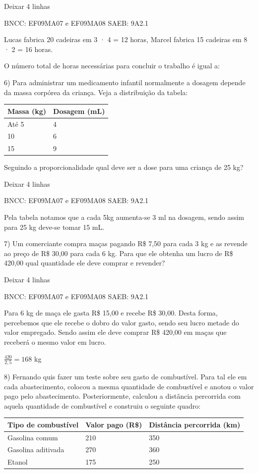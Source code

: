 \begin{escolha}
{{{\begin{escolha}
{Deixar 4 linhas

BNCC: EF09MA07 e EF09MA08 SAEB: 9A2.1

Lucas fabrica 20 cadeiras em 3 · 4 = 12 horas, Marcel fabrica 15
cadeiras em 8 · 2 = 16 horas.

O número total de horas necessárias para concluir o trabalho é igual a:

6) Para administrar um medicamento infantil normalmente a dosagem
depende da massa corpórea da criança. Veja a distribuição da tabela:

\begin{longtable}[]{@{}ll@{}}
\toprule\noalign{}
\textbf{Massa (kg)} & \textbf{Dosagem (mL)} \\
\midrule\noalign{}
\endhead
\bottomrule\noalign{}
\endlastfoot
Até 5 & 4 \\
10 & 6 \\
15 & 9 \\
\end{longtable}

Seguindo a proporcionalidade qual deve ser a dose para uma criança de 25
kg?

Deixar 4 linhas

BNCC: EF09MA07 e EF09MA08 SAEB: 9A2.1

Pela tabela notamos que a cada 5kg aumenta-se 3 ml na dosagem, sendo
assim para 25 kg deve-se tomar 15 mL.

7) Um comerciante compra maças pagando R\$ 7,50 para cada 3 kg e as
revende ao preço de R\$ 30,00 para cada 6 kg. Para que ele obtenha um
lucro de R\$ 420,00 qual quantidade ele deve comprar e revender?

Deixar 4 linhas

BNCC: EF09MA07 e EF09MA08 SAEB: 9A2.1

Para 6 kg de maça ele gasta R\$ 15,00 e recebe R\$ 30,00. Desta forma,
percebemos que ele recebe o dobro do valor gasto, sendo seu lucro metade
do valor empregado. Sendo assim ele deve comprar R\$ 420,00 em maças que
receberá o mesmo valor em lucro.

\(\frac{420}{2,5} = 168\) kg

8) Fernando quis fazer um teste sobre seu gasto de combustível. Para tal
ele em cada abastecimento, colocou a mesma quantidade de combustível e
anotou o valor pago pelo abastecimento. Posteriormente, calculou a
distância percorrida com aquela quantidade de combustível e construiu o
seguinte quadro:

\begin{longtable}[]{@{}lll@{}}
\toprule\noalign{}
\textbf{Tipo de combustível} & \textbf{Valor pago (R\$)} &
\textbf{Distância percorrida (km)} \\
\midrule\noalign{}
\endhead
\bottomrule\noalign{}
\endlastfoot
Gasolina comum & 210 & 350 \\
Gasolina aditivada & 270 & 360 \\
Etanol & 175 & 250 \\
\end{longtable}

}
\end{escolha}}}}
\end{escolha}
